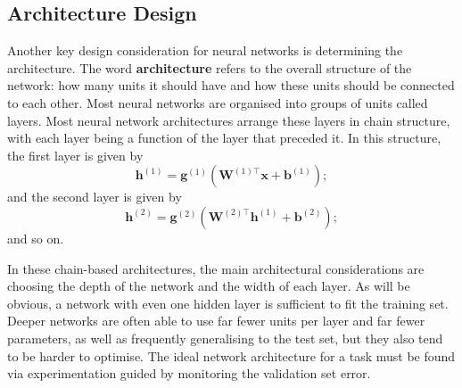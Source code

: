 \subsection{Architecture Design}
Another key design consideration for neural networks is determining the
architecture. The word \textbf{architecture} refers to the overall structure
of the network: how many units it should have and how these units should be
connected to each other. Most neural networks are organised into groups of
units called layers. Most neural network architectures arrange these layers in
chain structure, with each layer being a function of the layer that preceded
it. In this structure, the first layer is given by
\begin{equation*}
    \boldsymbol{h}^{(1)} =
    \boldsymbol{g}^{(1)}(\boldsymbol{W}^{(1)\top}\boldsymbol{x} +
    \boldsymbol{b}^{(1)});
\end{equation*}
and the second layer is given by
\begin{equation*}
    \boldsymbol{h}^{(2)} =
    \boldsymbol{g}^{(2)}(\boldsymbol{W}^{(2)\top}\boldsymbol{h}^{(1)} +
    \boldsymbol{b}^{(2)});
\end{equation*}
and so on.


In these chain-based architectures, the main architectural considerations are
choosing the depth of the network and the width of each layer. As will be
obvious, a network with even one hidden layer is sufficient to fit the training
set. Deeper networks are often able to use far fewer units per layer and far
fewer parameters, as well as frequently generalising to the test set, but they
also tend to be harder to optimise. The ideal network architecture for a task
must be found via experimentation guided by monitoring the validation set
error.
